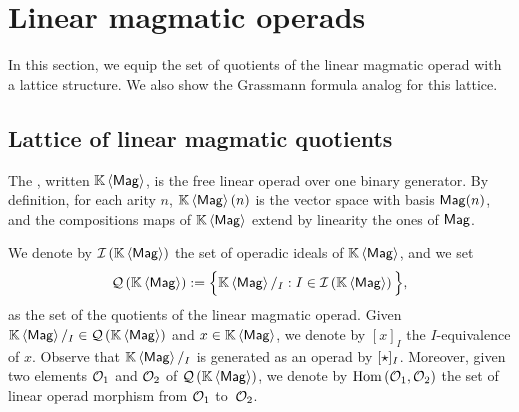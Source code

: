 \section{Linear magmatic operads} \label{sec:Magmatic_operads}
In this section, we equip the set of quotients of the linear magmatic
operad with a lattice structure. We also show the Grassmann formula
analog for this lattice.
\medbreak

\subsection{Lattice of linear magmatic quotients}
The , written $\KMag$, is the free linear
operad over one binary generator. By definition, for each arity $n$,
$\KMag(n)$ is the vector space with basis $\Mag(n)$, and the
compositions maps of $\KMag$ extend by linearity the ones of $\Mag$.
\medbreak

We denote by $\IMag$ the set of operadic ideals of $\KMag$, and we set
\begin{equation} \label{equ:definition_of_QMag}
    \QMag := \Big\{\KMag/_I :  I\in\IMag\Big\},
\end{equation}
as the set of the quotients of the linear magmatic operad. Given
$\KMag/_I \in \QMag$ and $x \in \KMag$, we denote by $[x]_I$ the
$I$-equivalence of $x$. Observe that $\KMag/_I$ is generated as an
operad by $[\Product]_I$. Moreover, given two  elements $\Oca_1$ and
$\Oca_2$ of $\QMag$, we denote by $\Hom\left(\Oca_1,\Oca_2\right)$ the
set of linear operad morphism from $\Oca_1$ to~$\Oca_2$.
\medbreak

